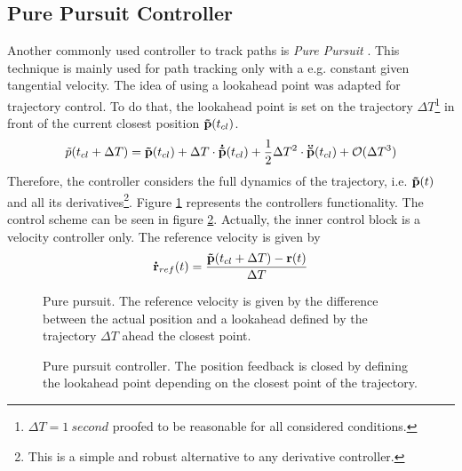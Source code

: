 
\subsection{Pure Pursuit Controller}
Another commonly used controller to track paths is \textit{Pure Pursuit} \cite{snider}. This technique is mainly used for path tracking only with a e.g. constant given tangential velocity. The idea of using a lookahead point was adapted for trajectory control. To do that, the lookahead point is set on the trajectory $\Delta T$\footnote{$\Delta T = \SI{1}{second}$ proofed to be reasonable for all considered conditions.} in front of the current closest position ${\bf \tilde{p}}(t_{cl})$.
\begin{equation}
\tilde{p}(t_{cl}+\Delta T) = {\bf \tilde{p}}(t_{cl}) + \Delta T \cdot {\bf\dot{ \tilde{p}}}(t_{cl}) + \frac{1}{2} \Delta T^2 \cdot {\bf\ddot{ \tilde{p}}}(t_{cl}) + \mathcal{O}(\Delta T^3)
\end{equation}
Therefore, the controller considers the full dynamics of the trajectory, i.e. ${\bf \tilde{p}}(t)$ and all its derivatives\footnote{This is a simple and robust alternative to any derivative controller.}.
Figure \ref{fig:scene_purePursuit} represents the controllers functionality. The control scheme can be seen in figure \ref{fig:purePursuit}. Actually, the inner control block is a velocity controller only. The reference velocity is given by
\begin{equation}
{\bf \dot{r}}_{ref}(t) = \frac{{\bf \tilde{p}}(t_{cl}+\Delta T)-{\bf r}(t)}{\Delta T}
\end{equation}


\begin{figure}[H]
    \centering
    \def\svgwidth{0.5\columnwidth}
    
    \caption{Pure pursuit. The reference velocity is given by the difference between the actual position and a lookahead defined by the trajectory $\Delta T$ ahead the closest point.}
    \label{fig:scene_purePursuit}
\end{figure}

\begin{figure}[H]
    \centering
    \def\svgwidth{\columnwidth}
    
    \caption{Pure pursuit controller. The position feedback is closed by defining the lookahead point depending on the closest point of the trajectory.}
    \label{fig:purePursuit}
\end{figure}

